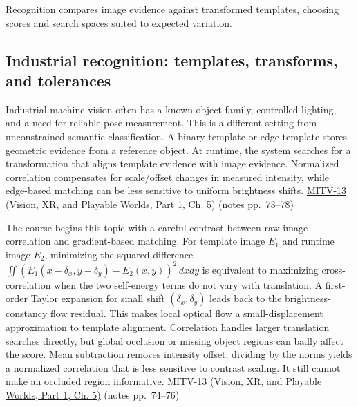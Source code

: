 \hypertarget{04-visual-computing-ii-ch030-recognition-templates-and-industrial-matching}{}

Recognition compares image evidence against transformed templates, choosing scores and search spaces suited to expected variation.

\subsection{Industrial recognition: templates, transforms, and tolerances}\label{04-visual-computing-ii-ch030-industrial-recognition-templates-transforms-and-tolerances}

\hypertarget{04-visual-computing-ii-ch030-industrial-recognition-templates-transforms-and-tolerances}{}

Industrial machine vision often has a known object family, controlled lighting, and a need for reliable pose measurement. This is a different setting from unconstrained semantic classification. A binary template or edge template stores geometric evidence from a reference object. At runtime, the system searches for a transformation that aligns template evidence with image evidence. Normalized correlation compensates for scale/offset changes in measured intensity, while edge-based matching can be less sensitive to uniform brightness shifts. \href{../07-Vision-XR-and-Playable-Worlds-P01/main.pdf\#nameddest=04-visual-computing-ii-ch036-mitv-13---object-detection-recognition-and-pose-determination-patquick-us-7016539}{MITV-13 (Vision, XR, and Playable Worlds, Part 1, Ch. 5)} (notes pp.~73--78)

The course begins this topic with a careful contrast between raw image correlation and gradient-based matching. For template image \(E_1\) and runtime image \(E_2\), minimizing the squared difference \(\iint(E_1(x-\delta_x,y-\delta_y)-E_2(x,y))^2\,dxdy\) is equivalent to maximizing cross-correlation when the two self-energy terms do not vary with translation. A first-order Taylor expansion for small shift \((\delta_x,\delta_y)\) leads back to the brightness-constancy flow residual. This makes local optical flow a small-displacement approximation to template alignment. Correlation handles larger translation searches directly, but global occlusion or missing object regions can badly affect the score. Mean subtraction removes intensity offset; dividing by the norms yields a normalized correlation that is less sensitive to contrast scaling. It still cannot make an occluded region informative. \href{../07-Vision-XR-and-Playable-Worlds-P01/main.pdf\#nameddest=04-visual-computing-ii-ch036-mitv-13---object-detection-recognition-and-pose-determination-patquick-us-7016539}{MITV-13 (Vision, XR, and Playable Worlds, Part 1, Ch. 5)} (notes pp.~74--76)

